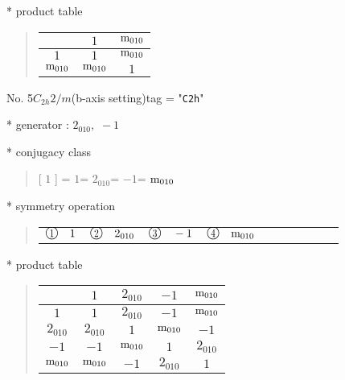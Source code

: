 \documentclass[fleqn,10pt,landscape]{jsarticle}
\begin{document}
* product table
\begin{quote}
\begin{tabular}{ccc} \hline \hline
 & $ 1 $ & $ {\rm m}_{010} $ \\ \hline
$ 1 $ & $ 1 $ & $ {\rm m}_{010} $ \\
$ {\rm m}_{010} $ & $ {\rm m}_{010} $ & $ 1 $ \\
 \hline \hline
\end{tabular}
\end{quote}

\newpage

No. 5\quad$C_{2h}$\quad$2/m$\quad(b-axis setting)\quad[ monoclinic ]
tag = "{\tt C2h}"

* generator : $2{}_{010},\,\,-1$

* conjugacy class
\begin{quote}
[ $1$ ] = \quad $1$\newline[ $2{}_{010}$ ] = \quad $2{}_{010}$\newline[ $-1$ ] = \quad $-1$\newline[ ${\rm m}_{010}$ ] = \quad ${\rm m}_{010}$\newline
\end{quote}

* symmetry operation
\begin{quote}
\begin{tabular}{llllllllll}
$ {\ooalign{\hfil\resizebox{.8\width}{\height}{1}\hfil\crcr\raise.1ex\hbox{\large$\bigcirc$}}}\quad 1 $ & $ {\ooalign{\hfil\resizebox{.8\width}{\height}{2}\hfil\crcr\raise.1ex\hbox{\large$\bigcirc$}}}\quad 2{}_{010} $ & $ {\ooalign{\hfil\resizebox{.8\width}{\height}{3}\hfil\crcr\raise.1ex\hbox{\large$\bigcirc$}}}\quad -1 $ & $ {\ooalign{\hfil\resizebox{.8\width}{\height}{4}\hfil\crcr\raise.1ex\hbox{\large$\bigcirc$}}}\quad {\rm m}_{010} $
\end{tabular}
\end{quote}

* product table
\begin{quote}
\begin{tabular}{ccccc} \hline \hline
 & $ 1 $ & $ 2{}_{010} $ & $ -1 $ & $ {\rm m}_{010} $ \\ \hline
$ 1 $ & $ 1 $ & $ 2{}_{010} $ & $ -1 $ & $ {\rm m}_{010} $ \\
$ 2{}_{010} $ & $ 2{}_{010} $ & $ 1 $ & $ {\rm m}_{010} $ & $ -1 $ \\
$ -1 $ & $ -1 $ & $ {\rm m}_{010} $ & $ 1 $ & $ 2{}_{010} $ \\
$ {\rm m}_{010} $ & $ {\rm m}_{010} $ & $ -1 $ & $ 2{}_{010} $ & $ 1 $ \\
 \hline \hline
\end{tabular}
\end{quote}
\end{document}
